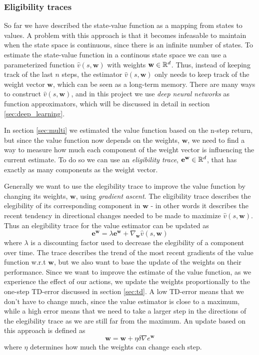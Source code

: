 \documentclass[11pt]{article}
\begin{document}
\subsubsection{Eligibility traces}\label{sec:et}

So far we have described the state-value function as a mapping from states to values.
A problem with this approach is that it becomes infeasable to maintain 
when the state space is continuous, since there is an infinite number of states.
To estimate the state-value function in a continous state space we can use a
parameterized function $\hat{v}(s, \mathbf{w})$ with weights $\mathbf{w} \in \mathbb{R}^d$.
Thus, instead of keeping track of the last $n$ steps, the estimator $\hat{v}(s, \mathbf{w})$
only needs to keep track of the weight vector $\mathbf{w}$, which can be seen as a long-term memory.
There are many ways to construct $\hat{v}(s, \mathbf{w})$, and in this project we use \textit{deep neural networks}
as function approximators, which will be discussed in detail in section \ref{sec:deep_learning}.

In section \ref{sec:multi} we estimated the value function based on the n-step return, but
since the value function now depends on the weights, $\mathbf{w}$, we need to find a way
to measure how much each component of the weight vector is influencing the
current estimate.
To do so we can use an \textit{eligibility trace}, $\mathbf{e}^{\mathbf{w}} \in \mathbb{R}^d$, that
has exactly as many components as the weight vector.

Generally we want to use the elegibility trace to improve the value function by
changing its weights, $\mathbf{w}$, using \textit{gradient ascent}.
The eligibility trace describes the elegibility of its corresponding component in $\mathbf{w}$
- in other words it describes the recent tendency in directional changes needed to be made
to maximize $\hat{v}(s, \mathbf{w})$.
Thus an elegibility trace for the value estimator can be updated as
\begin{equation}
    \mathbf{e}^\mathbf{w} = \lambda \mathbf{e}^\mathbf{w} + \nabla_\mathbf{w} \hat{v}(s, \mathbf{w})
\end{equation}
where $\lambda$ is a discounting factor used to decrease the elegibility of a component
over time.
The trace describes the trend of the most recent gradients of the value function
w.r.t $\mathbf{w}$, but we also want to base the update of the weights on their
performance.
Since we want to improve the estimate of the value function, as we experience the effect of our actions,
we update the weights proportionally to the one-step TD-error discussed in section \ref{sec:td}.
A low TD-error means that we don't have to change much, since the value estimator is
close to a maximum, while a high error means that we need to take a larger step
in the directions of the elegibility trace as we are still far from the maximum.
An update based on this approach is defined as
\begin{equation}
    \mathbf{w} = \mathbf{w} + \eta \delta \nabla e^\mathbf{w}
\end{equation}
where $\eta$ determines how much the weights can change each step.
\end{document}
